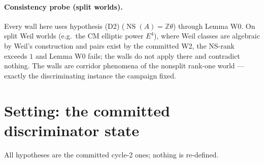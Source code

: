 \documentclass[11pt]{article}
\theoremstyle{definition}
\newcommand{\NS}{\operatorname{NS}}
\newcommand{\Z}{\mathbb{Z}}
\begin{document}
\paragraph{Consistency probe (split worlds).}
Every wall here uses hypothesis (D2) ($\NS(A)=\Z\theta$) through Lemma W0.
On split Weil worlds (e.g.\ the CM elliptic power $E^4$), where Weil classes
are algebraic by Weil's construction and pairs exist by the committed W2,
the NS-rank exceeds $1$ and Lemma W0 fails; the walls do not apply there and
contradict nothing. The walls are corridor phenomena of the nonsplit
rank-one world --- exactly the discriminating instance the campaign fixed.

\section{Setting: the committed discriminator state}\label{sec:setting}

All hypotheses are the committed cycle-2 ones; nothing is re-defined.
\end{document}
